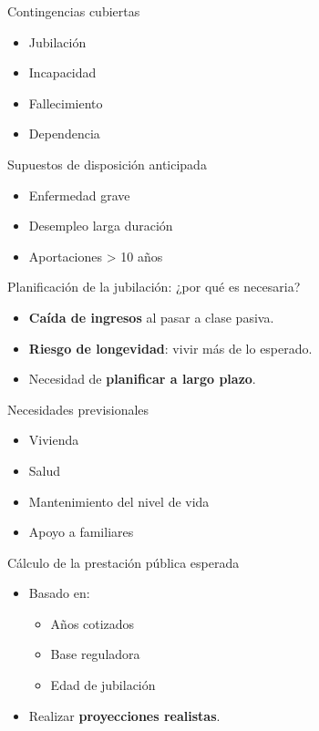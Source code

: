 \documentclass[
  ignorenonframetext,
  aspectratio=54,
  spanish,
]{beamer}
\providecommand{\tightlist}{%
  \setlength{\itemsep}{0pt}\setlength{\parskip}{0pt}}
\begin{document}
\begin{frame}{Contingencias cubiertas}
\label{contingencias-cubiertas}
\begin{itemize}
\tightlist
\item
  Jubilación
\item
  Incapacidad
\item
  Fallecimiento
\item
  Dependencia
\end{itemize}
\end{frame}

\begin{frame}{Supuestos de disposición anticipada}
\label{supuestos-de-disposiciuxf3n-anticipada}
\begin{itemize}
\tightlist
\item
  Enfermedad grave
\item
  Desempleo larga duración
\item
  Aportaciones \textgreater{} 10 años
\end{itemize}
\end{frame}

\begin{frame}{Planificación de la jubilación: ¿por qué es necesaria?}
\label{planificaciuxf3n-de-la-jubilaciuxf3n-por-quuxe9-es-necesaria}
\begin{itemize}
\tightlist
\item
  \textbf{Caída de ingresos} al pasar a clase pasiva.
\item
  \textbf{Riesgo de longevidad}: vivir más de lo esperado.
\item
  Necesidad de \textbf{planificar a largo plazo}.
\end{itemize}
\end{frame}

\begin{frame}{Necesidades previsionales}
\label{necesidades-previsionales}
\begin{itemize}
\tightlist
\item
  Vivienda
\item
  Salud
\item
  Mantenimiento del nivel de vida
\item
  Apoyo a familiares
\end{itemize}
\end{frame}

\begin{frame}{Cálculo de la prestación pública esperada}
\label{cuxe1lculo-de-la-prestaciuxf3n-puxfablica-esperada}
\begin{itemize}
\tightlist
\item
  Basado en:

  \begin{itemize}
  \tightlist
  \item
    Años cotizados
  \item
    Base reguladora
  \item
    Edad de jubilación
  \end{itemize}
\item
  Realizar \textbf{proyecciones realistas}.
\end{itemize}
\end{frame}
\end{document}
